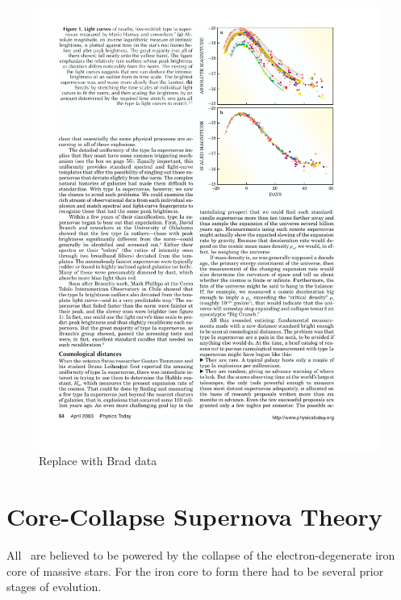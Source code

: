 \begin{figure}[htbp] %
   \centering
   \includegraphics[width=\textwidth]{chapter_intro/plots/lightcurve_scaled_perlmutter2003.pdf} 
   \caption{Replace with Brad data}
   \label{fig:normalized_lightcurve}
\end{figure}


\section{Core-Collapse Supernova Theory}

All \snii\ are believed to be powered by the collapse of the electron-degenerate iron core of massive stars. For the iron core to form there had to be several prior stages of evolution.


